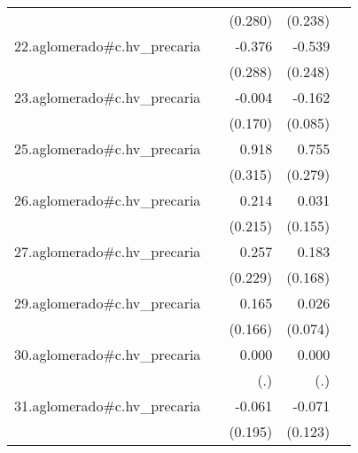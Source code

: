 {\begin{longtable}{l*{4}{D{.}{.}{-1}}}
            &                     &     (0.280)         &     (0.238)         &                     \\
\addlinespace
22.aglomerado#c.hv\_precaria&                     &      -0.376         &      -0.539\sym{*}  &                     \\
            &                     &     (0.288)         &     (0.248)         &                     \\
\addlinespace
23.aglomerado#c.hv\_precaria&                     &      -0.004         &      -0.162         &                     \\
            &                     &     (0.170)         &     (0.085)         &                     \\
\addlinespace
25.aglomerado#c.hv\_precaria&                     &       0.918\sym{**} &       0.755\sym{**} &                     \\
            &                     &     (0.315)         &     (0.279)         &                     \\
\addlinespace
26.aglomerado#c.hv\_precaria&                     &       0.214         &       0.031         &                     \\
            &                     &     (0.215)         &     (0.155)         &                     \\
\addlinespace
27.aglomerado#c.hv\_precaria&                     &       0.257         &       0.183         &                     \\
            &                     &     (0.229)         &     (0.168)         &                     \\
\addlinespace
29.aglomerado#c.hv\_precaria&                     &       0.165         &       0.026         &                     \\
            &                     &     (0.166)         &     (0.074)         &                     \\
\addlinespace
30.aglomerado#c.hv\_precaria&                     &       0.000         &       0.000         &                     \\
            &                     &         (.)         &         (.)         &                     \\
\addlinespace
31.aglomerado#c.hv\_precaria&                     &      -0.061         &      -0.071         &                     \\
            &                     &     (0.195)         &     (0.123)         &                     \\

\end{longtable}}
